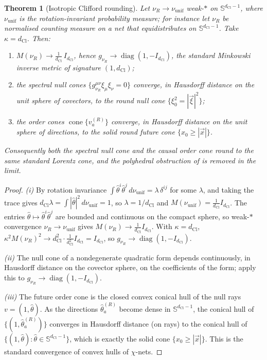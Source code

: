 \documentclass[11pt]{article}
\newtheorem{theorem}{Theorem}[section]
\theoremstyle{definition}
\theoremstyle{remark}
\newcommand{\dCl}{d_{\mathrm{Cl}}}
\newcommand{\Sphere}{\mathbb{S}}
\newcommand{\cone}{\operatorname{cone}}
\begin{document}
\begin{theorem}[Isotropic Clifford rounding]
\label{thm:model-rounding}
Let $\nu_R\to\nu_{\mathrm{unif}}$ weak-$*$ on $\Sphere^{\dCl-1}$, where
$\nu_{\mathrm{unif}}$ is the rotation-invariant probability measure; for
instance let $\nu_R$ be normalised counting measure on a net that
equidistributes on $\Sphere^{\dCl-1}$.  Take $\kappa=\dCl$.  Then:
\begin{enumerate}[label=\textup{(\roman*)},leftmargin=2.2em]
\item $M(\nu_R)\to \tfrac1{\dCl}\,I_{\dCl}$, hence $g_{\nu_R}\to
      \operatorname{diag}(1,-I_{\dCl})$, the standard Minkowski inverse metric of
      signature $(1,\dCl)$;
\item the spectral null cones $\{g_{\nu_R}^{\mu\nu}\xi_\mu\xi_\nu=0\}$ converge,
      in Hausdorff distance on the unit sphere of covectors, to the round null
      cone $\{\xi_0^2=|\vec\xi|^2\}$;
\item the order cones $\cone\{v_a^{(R)}\}$ converge, in Hausdorff distance on
      the unit sphere of directions, to the solid round future cone
      $\{x_0\ge|\vec x|\}$.
\end{enumerate}
Consequently both the spectral null cone and the causal order cone round to the
same standard Lorentz cone, and the polyhedral obstruction of
 is removed in the limit.
\end{theorem}

\begin{proof}
\emph{(i)} By rotation invariance $\int\hat\theta^i\hat\theta^j\,
d\nu_{\mathrm{unif}}=\lambda\,\delta^{ij}$ for some $\lambda$, and taking the
trace gives $\dCl\lambda=\int|\hat\theta|^2\,d\nu_{\mathrm{unif}}=1$, so
$\lambda=1/\dCl$ and $M(\nu_{\mathrm{unif}})=\tfrac1{\dCl} I_{\dCl}$.  The entries
$\hat\theta\mapsto\hat\theta^i\hat\theta^j$ are bounded and continuous on the
compact sphere, so weak-$*$ convergence $\nu_R\to\nu_{\mathrm{unif}}$ gives
$M(\nu_R)\to\tfrac1{\dCl} I_{\dCl}$.  With $\kappa=\dCl$, $\kappa^2M(\nu_R)^2\to
\dCl^2\cdot\tfrac1{\dCl^2}I_{\dCl}=I_{\dCl}$, so $g_{\nu_R}\to\operatorname{diag}(1,-I_{\dCl})$.

\emph{(ii)} The null cone of a nondegenerate quadratic form depends
continuously, in Hausdorff distance on the covector sphere, on the coefficients
of the form; apply this to $g_{\nu_R}\to\operatorname{diag}(1,-I_{\dCl})$.

\emph{(iii)} The future order cone is the closed convex conical hull of the
null rays $v=(1,\hat\theta)$.  As the directions $\hat\theta_a^{(R)}$ become
dense in $\Sphere^{\dCl-1}$, the conical hull of $\{(1,\hat\theta_a^{(R)})\}$
converges in Hausdorff distance (on rays) to the conical hull of
$\{(1,\hat\theta):\hat\theta\in\Sphere^{\dCl-1}\}$, which is exactly the solid cone
$\{x_0\ge|\vec x|\}$.  This is the standard convergence of convex hulls of
$\chi$-nets.
\end{proof}
\end{document}
